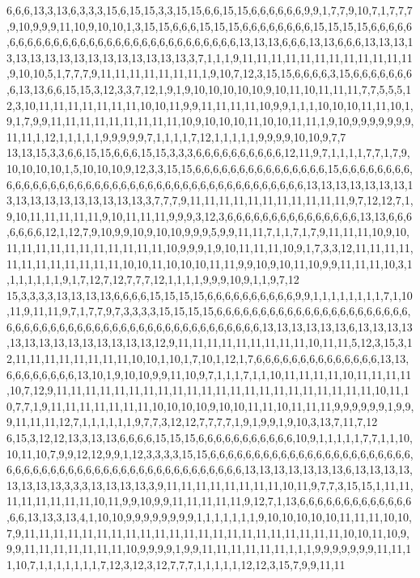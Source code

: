 6,6,6,13,3,13,6,3,3,3,15,6,15,15,3,3,15,15,6,6,15,15,6,6,6,6,6,6,9,9,1,7,7,9,10,7,1,7,7,7,9,10,9,9,9,11,10,9,10,10,1,3,15,15,6,6,6,15,15,15,6,6,6,6,6,6,6,6,15,15,15,15,6,6,6,6,6,6,6,6,6,6,6,6,6,6,6,6,6,6,6,6,6,6,6,6,6,6,6,6,6,6,6,13,13,13,6,6,6,13,13,6,6,6,13,13,13,13,13,13,13,13,13,13,13,13,13,13,13,13,3,7,1,1,1,9,11,11,11,11,11,11,11,11,11,11,11,11,9,10,10,5,1,7,7,7,9,11,11,11,11,11,11,11,1,9,10,7,12,3,15,15,6,6,6,6,3,15,6,6,6,6,6,6,6,6,13,13,6,6,15,15,3,12,3,3,7,12,1,9,1,9,10,10,10,10,10,9,10,11,10,11,11,11,7,7,5,5,5,12,3,10,11,11,11,11,11,11,11,10,10,11,9,9,11,11,11,11,10,9,9,1,1,1,10,10,10,11,11,10,1,9,1,7,9,9,11,11,11,11,11,11,11,11,11,10,9,10,10,10,11,10,10,11,11,1,9,10,9,9,9,9,9,9,9,11,11,1,12,1,1,1,1,1,9,9,9,9,9,7,1,1,1,1,7,12,1,1,1,1,1,9,9,9,9,10,10,9,7,7
13,13,15,3,3,6,6,15,15,6,6,6,15,15,3,3,3,6,6,6,6,6,6,6,6,6,6,12,11,9,7,1,1,1,1,7,7,1,7,9,10,10,10,10,1,5,10,10,10,9,12,3,3,15,15,6,6,6,6,6,6,6,6,6,6,6,6,6,6,6,15,6,6,6,6,6,6,6,6,6,6,6,6,6,6,6,6,6,6,6,6,6,6,6,6,6,6,6,6,6,6,6,6,6,6,6,6,6,6,6,6,6,6,13,13,13,13,13,13,13,13,13,13,13,13,13,13,13,13,13,3,7,7,7,9,11,11,11,11,11,11,11,11,11,11,11,9,7,12,12,7,1,9,10,11,11,11,11,11,9,10,11,11,11,9,9,9,3,12,3,6,6,6,6,6,6,6,6,6,6,6,6,6,6,6,13,13,6,6,6,6,6,6,6,12,1,12,7,9,10,9,9,10,9,10,10,9,9,9,5,9,9,11,11,7,1,1,7,1,7,9,11,11,11,10,9,10,11,11,11,11,11,11,11,11,11,11,11,10,9,9,9,1,9,10,11,11,11,10,9,1,7,3,3,12,11,11,11,11,11,11,11,11,11,11,11,11,10,10,11,10,10,10,11,11,9,9,10,9,10,11,10,9,9,11,11,11,10,3,1,1,1,1,1,1,1,9,1,7,12,7,12,7,7,7,12,1,1,1,1,9,9,9,10,9,1,1,9,7,12
15,3,3,3,3,13,13,13,13,6,6,6,6,15,15,15,15,6,6,6,6,6,6,6,6,6,6,9,9,1,1,1,1,1,1,1,1,7,1,10,11,9,11,11,9,7,1,7,7,9,7,3,3,3,3,15,15,15,15,6,6,6,6,6,6,6,6,6,6,6,6,6,6,6,6,6,6,6,6,6,6,6,6,6,6,6,6,6,6,6,6,6,6,6,6,6,6,6,6,6,6,6,6,6,6,6,6,6,6,6,13,13,13,13,13,13,6,13,13,13,13,13,13,13,13,13,13,13,13,13,13,12,9,11,11,11,11,11,11,11,11,11,10,11,11,5,12,3,15,3,12,11,11,11,11,11,11,11,11,10,10,1,10,1,7,10,1,12,1,7,6,6,6,6,6,6,6,6,6,6,6,6,6,6,13,13,6,6,6,6,6,6,6,6,13,10,1,9,10,10,9,9,11,10,9,7,1,1,1,7,1,1,10,11,11,11,11,10,11,11,11,11,10,7,12,9,11,11,11,11,11,11,11,11,11,11,11,11,11,11,11,11,11,11,11,11,11,11,10,11,10,7,7,1,9,11,11,11,11,11,11,11,10,10,10,10,9,10,10,11,11,10,11,11,11,9,9,9,9,9,9,1,9,9,9,11,11,11,12,7,1,1,1,1,1,1,9,7,7,3,12,12,7,7,7,7,1,9,1,9,9,1,9,10,3,13,7,11,7,12
6,15,3,12,12,13,3,13,13,6,6,6,6,15,15,15,6,6,6,6,6,6,6,6,6,6,6,10,9,1,1,1,1,1,7,7,1,1,10,10,11,10,7,9,9,12,12,9,9,1,12,3,3,3,3,15,15,6,6,6,6,6,6,6,6,6,6,6,6,6,6,6,6,6,6,6,6,6,6,6,6,6,6,6,6,6,6,6,6,6,6,6,6,6,6,6,6,6,6,6,6,6,6,6,6,6,6,13,13,13,13,13,13,13,6,13,13,13,13,13,13,13,13,3,3,3,13,13,13,13,3,9,11,11,11,11,11,11,11,11,10,11,9,7,7,3,15,15,1,11,11,11,11,11,11,11,11,10,11,9,9,10,9,9,11,11,11,11,11,9,12,7,1,13,6,6,6,6,6,6,6,6,6,6,6,6,6,6,6,13,13,3,13,4,1,10,10,9,9,9,9,9,9,9,9,1,1,1,1,1,1,1,9,10,10,10,10,10,11,11,11,10,10,7,9,11,11,11,11,11,11,11,11,11,11,11,11,11,11,11,11,11,11,11,11,11,11,10,10,11,10,9,9,9,11,11,11,11,11,11,11,10,9,9,9,9,1,9,9,11,11,11,11,11,11,1,1,1,9,9,9,9,9,9,9,11,11,11,10,7,1,1,1,1,1,1,1,7,12,3,12,3,12,7,7,7,1,1,1,1,1,12,12,3,15,7,9,9,11,11
